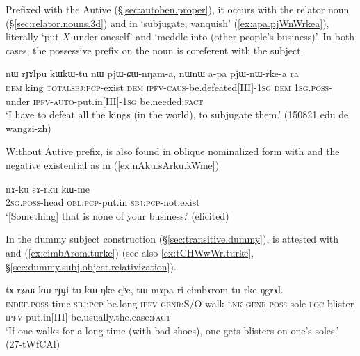 Prefixed with the Autive  (§\ref{sec:autoben.proper}), it occurs with the relator noun  (§\ref{sec:relator.nouns.3d}) and  in  `subjugate, vanquish' (\ref{ex:apa.pjWnWrkea}), literally `put $X$ under oneself' and  `meddle into (other people's business)'. In both cases, the possessive prefix on the noun is coreferent with the subject.

\begin{exe}
\ex \label{ex:apa.pjWnWrkea}
\gll nɯ rɟɤlpu kɯ\redp{}kɯ-tu nɯ pjɯ-ɕɯ-nŋam-a, nɯnɯ a-pa pjɯ-nɯ-rke-a ra \\
\textsc{dem} king \textsc{total}\redp{}\textsc{sbj}:\textsc{pcp}-exist \textsc{dem} \textsc{ipfv}-\textsc{caus}-be.defeated[III]-\textsc{1sg} \textsc{dem} \textsc{1sg}.\textsc{poss}-under \textsc{ipfv}-\textsc{auto}-put.in[III]-\textsc{1sg} be.needed:\textsc{fact} \\
\glt `I have to defeat all the kings (in the world), to subjugate them.' (150821 edu de wangzi-zh)
\end{exe}


Without Autive prefix,  is also found in oblique nominalized form with  and the negative existential  as in (\ref{ex:nAku.sArku.kWme})

\begin{exe}
\ex \label{ex:nAku.sArku.kWme}
\gll nɤ-ku sɤ-rku kɯ-me \\
\textsc{2sg}.\textsc{poss}-head \textsc{obl}:\textsc{pcp}-put.in \textsc{sbj}:\textsc{pcp}-not.exist  \\
\glt `[Something] that is none of your business.' (elicited)
\end{exe}

In the dummy subject construction (§\ref{sec:transitive.dummy}),  is attested with  and  (\ref{ex:cimbArom.turke}) (see also \ref{ex:tCHWwWr.turke}, §\ref{sec:dummy.subj.object.relativization}).

\begin{exe}
\ex \label{ex:cimbArom.turke}
\gll tɤ-rʑaʁ kɯ-rɲɟi tu-kɯ-ŋke qʰe, tɯ-mɤpa ri cimbɤrom tu-rke ŋgrɤl. \\
\textsc{indef}.\textsc{poss}-time \textsc{sbj}:\textsc{pcp}-be.long \textsc{ipfv}-\textsc{genr}:S/O-walk \textsc{lnk} \textsc{genr}.\textsc{poss}-sole \textsc{loc} blister \textsc{ipfv}-put.in[III] be.usually.the.case:\textsc{fact} \\
\glt `If one walks for a long time (with bad shoes), one gets blisters on one's soles.' (27-tWfCAl)
\end{exe}
 
